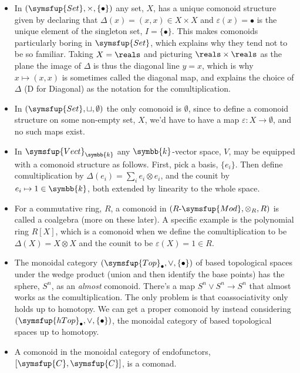 \documentclass[fleqn]{NotesClass}
\makeatletter
\newcommand{\cat}[1]{\symsfup{#1}}
\newcommand{\c@egory}[1]{\symsfup{#1}}
\newcommand{\Set}{\c@egory{Set}}
\newcommand{\Vect}[1][\field]{\c@egory{Vect}_{#1}}
\newcommand{\RMod}[1][R]{#1\text{-}\c@egory{Mod}}
\newcommand{\TopPt}{\c@egory{Top}_{\bullet}}
\newcommand{\hTopPt}{\c@egory{hTop}_{\bullet}}
\renewcommand{\field}{\symbb{k}}
\makeatother
\begin{document}
    \begin{exm}{}{}
        \begin{itemize}
            \item In \((\Set, \times, \{\bullet\})\) any set, \(X\), has a unique comonoid structure given by declaring that \(\Delta(x) = (x, x) \in X \times X\) and \(\varepsilon(x) = \bullet\) is the unique element of the singleton set, \(I = \{\bullet\}\).
            This makes comonoids particularly boring in \(\Set\), which explains why they tend not to be so familiar.
            Taking \(X = \reals\) and picturing \(\reals \times \reals\) as the plane the image of \(\Delta\) is thus the diagonal line \(y = x\), which is why \(x \mapsto (x, x)\) is sometimes called the diagonal map, and explains the choice of \(\Delta\) (D for Diagonal) as the notation for the comultiplication.
            \item In \((\Set, \sqcup, \emptyset)\) the only comonoid is \(\emptyset\), since to define a comonoid structure on some non-empty set, \(X\), we'd have to have a map \(\varepsilon \colon X \to \emptyset\), and no such maps exist.
            \item In \(\Vect\) any \(\field\)-vector space, \(V\), may be equipped with a comonoid structure as follows.
            First, pick a basis, \(\{e_i\}\).
            Then define comultiplication by \(\Delta(e_i) = \sum_i e_i \otimes e_i\), and the counit by \(e_i \mapsto 1 \in \field\), both extended by linearity to the whole space.
            \item For a commutative ring, \(R\), a comonoid in \((\RMod, \otimes_R, R)\) is called a coalgebra (more on these later).
            A specific example is the polynomial ring \(R[X]\), which is a comonoid when we define the comultiplication to be \(\Delta(X) = X \otimes X\) and the counit to be \(\varepsilon(X) = 1 \in R\).
            \item The monoidal category \((\TopPt, \vee, \{\bullet\})\) of based topological spaces under the wedge product (union and then identify the base points) has the sphere, \(S^n\), as an \emph{almost} comonoid.
            There's a map \(S^n \vee S^n \to S^n\) that almost works as the comultiplication.
            The only problem is that coassociativity only holds up to homotopy.
            We can get a proper comonoid by instead considering \((\hTopPt, \vee, \{\bullet\})\), the monoidal category of based topological spaces up to homotopy.
            \item A comonoid in the monoidal category of endofunctors, \([\cat{C}, \cat{C}]\), is a comonad.
        \end{itemize}
    \end{exm}
    
\end{document}
